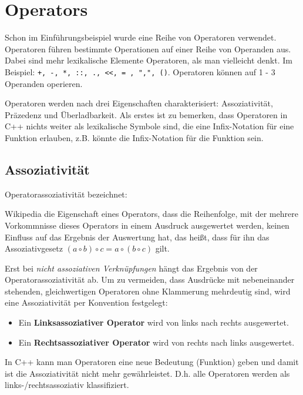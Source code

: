 
\section{Operators\label{sec:operator}}
Schon im Einführungsbeispiel wurde eine Reihe von Operatoren verwendet. Operatoren führen bestimmte Operationen auf einer Reihe von Operanden aus. Dabei sind mehr lexikalische Elemente Operatoren, als man vielleicht denkt. Im Beispiel: \texttt{+, -, *, ::, ., <<, = , ",", ()}. Operatoren können auf 1 - 3 Operanden operieren.

Operatoren werden nach drei Eigenschaften charakterisiert: Assoziativität, Präzedenz und Überladbarkeit. Als erstes ist zu bemerken, dass Operatoren in C++ nichts weiter als lexikalische Symbole sind, die eine Infix-Notation für eine Funktion erlauben, z.B. könnte  die Infix-Notation für die Funktion  sein.

\subsection{Assoziativität\label{sec:operator-associativity}}
Operatorassoziativität bezeichnet:

\begin{zitat}{Wikipedia}
    die Eigenschaft eines Operators, dass die Reihenfolge, mit der mehrere Vorkommnisse dieses Operators in einem Ausdruck ausgewertet werden, keinen Einfluss auf das Ergebnis der Auswertung hat, das heißt, dass für ihn das Assoziativgesetz $(a \circ b) \circ c = a \circ (b \circ c)$ gilt.
\end{zitat}

Erst bei \emph{nicht assoziativen Verknüpfungen} hängt das Ergebnis von der Operatorassoziativität ab. Um zu vermeiden, dass Ausdrücke mit nebeneinander stehenden, gleichwertigen Operatoren ohne Klammerung mehrdeutig sind, wird eine Assoziativität per Konvention festgelegt:
\begin{itemize}
\item Ein \textbf{Linksassoziativer Operator} wird von links nach rechts ausgewertet.
\item Ein \textbf{Rechtsassoziativer Operator} wird von rechts nach links ausgewertet.
\end{itemize}

In C++ kann man Operatoren eine neue Bedeutung (Funktion) geben und damit ist die Assoziativität
nicht mehr gewährleistet. D.h. alle Operatoren werden als links-/rechtsassoziativ klassifiziert.

